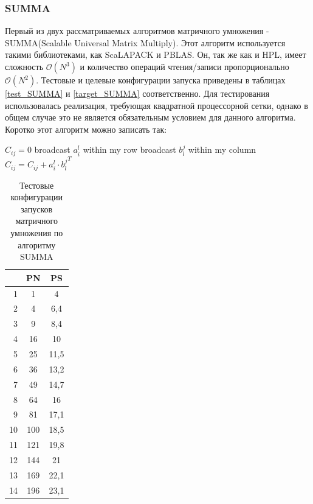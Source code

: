 		\subsubsection{SUMMA}
			Первый из двух рассматриваемых алгоритмов матричного умножения - SUMMA(Scalable Universal Matrix Multiply)\cite{SUMMA}. Этот алгоритм используется такими библиотеками, как ScaLAPACK и PBLAS. Он, так же как и HPL, имеет сложность \(\mathcal{O}(N^3)\) и количество операций чтения/записи пропорционально \(\mathcal{O}(N^2)\). Тестовые и целевые конфигурации запуска приведены в таблицах \eqref{test_SUMMA} и \eqref{target_SUMMA} соответственно. Для тестирования использовалась реализация, требующая квадратной процессорной сетки, однако в общем случае это не является обязательным условием для данного алгоритма. Коротко этот алгоритм можно записать так:
			\begin{algorithm}
				\begin{algorithmic}
					\State $C_{ij} = 0$
					\State broadcast $a_i^l$ within my row
					\State broadcast $b_l^j$ within my column
					\State $C_{ij} = C_{ij} + a_i^l \cdot {b_l^j}^T$
					\EndFor
				\label{SUMMA_algo}
				\end{algorithmic}
			\end{algorithm}

			\begin{table}
				\centering
				\begin{tabular}{|r|c|c|}
					\hline
					\textnumero & PN  & PS                     \\ \hline
					1           & 1   & 4                      \\ \hline
					2           & 4   & 6,4                    \\ \hline
					3           & 9   & 8,4                    \\ \hline
					4           & 16  & 10                     \\ \hline
					5           & 25  & 11,5                   \\ \hline
					6           & 36  & 13,2                   \\ \hline
					7           & 49  & 14,7                   \\ \hline
					8           & 64  & 16                     \\ \hline
					9           & 81  & 17,1                   \\ \hline
					10          & 100 & 18,5                   \\ \hline
					11          & 121 & 19,8                   \\ \hline
					12          & 144 & 21                     \\ \hline
					13          & 169 & 22,1                   \\ \hline
					14          & 196 & 23,1                   \\ \hline
				\end{tabular}
				\caption{Тестовые конфигурации запусков матричного умножения по алгоритму SUMMA}
				\label{test_SUMMA}
			\end{table}

